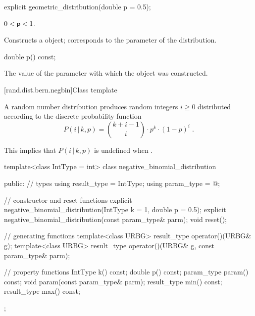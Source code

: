 %
\begin{itemdecl}
explicit geometric_distribution(double p = 0.5);
\end{itemdecl}

\begin{itemdescr}
\pnum\requires
 $0 < \texttt{\protect p} < 1$.

\pnum\effects Constructs a  object;
 corresponds to the parameter of the distribution.
\end{itemdescr}

%
\begin{itemdecl}
double p() const;
\end{itemdecl}

\begin{itemdescr}
\pnum\returns The value of the  parameter
 with which the object was constructed.
\end{itemdescr}


[rand.dist.bern.negbin]{Class template }
%
%

\pnum
A  random number distribution
produces random integers $i \geq 0$
distributed according to
the discrete probability function
%
%
\[%
 P(i\,|\,k,p)
      = \binom{k+i-1}{i} \cdot p^k \cdot (1-p)^i
\; \mbox{.}
\]
\begin{note}
This implies that $P(i\,|\,k,p)$ is undefined when .
\end{note}

%
\begin{codeblock}
template<class IntType = int>
  class negative_binomial_distribution {
  public:
    // types
    using result_type = IntType;
    using param_type  = @\unspec@;

    // constructor and reset functions
    explicit negative_binomial_distribution(IntType k = 1, double p = 0.5);
    explicit negative_binomial_distribution(const param_type& parm);
    void reset();

    // generating functions
    template<class URBG>
      result_type operator()(URBG& g);
    template<class URBG>
      result_type operator()(URBG& g, const param_type& parm);

    // property functions
    IntType k() const;
    double p() const;
    param_type param() const;
    void param(const param_type& parm);
    result_type min() const;
    result_type max() const;
  };
\end{codeblock}


